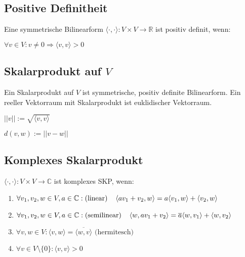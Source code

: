 \subsection*{Positive Definitheit}

Eine symmetrische Bilinearform $\langle \cdot, \cdot \rangle : V \times V \rightarrow \mathbb{R}$ ist positiv definit, wenn:

$\forall v \in V: v \neq 0 \Rightarrow \langle v, v \rangle > 0$

\subsection*{Skalarprodukt auf $V$}

Ein Skalarprodukt auf $V$ ist symmetrische, positiv definite Bilinearform. Ein reeller Vektorraum mit Skalarprodukt ist euklidischer Vektorraum.

\begin{description}[leftmargin=!,labelwidth=10mm]
	\item[Norm]   $||v|| := \sqrt{\langle v, v \rangle}$
	\item[Metrik] $d(v, w) := ||v - w||$
\end{description}

\subsection*{Komplexes Skalarprodukt}

$\langle \cdot, \cdot \rangle : V \times V \rightarrow \mathbb{C}$ ist komplexes SKP, wenn:

\begin{enumerate}[label=(\alph*)]
	\item $\forall v_1, v_2, w \in V, a \in \mathbb{C} : \text{(linear)} \\ \hspace*{4mm} \langle av_1 + v_2, w \rangle = a \langle v_1, w \rangle + \langle v_2, w \rangle$
	\item $\forall v_1, v_2, w \in V, a \in \mathbb{C} : \text{(semilinear)} \\ \hspace*{4mm} \langle w, av_1 + v_2 \rangle = \overline a \langle w, v_1 \rangle + \langle w, v_2 \rangle$
	\item $\forall v, w \in V : \langle v, w \rangle = \overline{\langle w, v \rangle} \text{ (hermitesch)}$
	\item $\forall v \in V \setminus \{0\} : \langle v, v \rangle > 0$
\end{enumerate}

